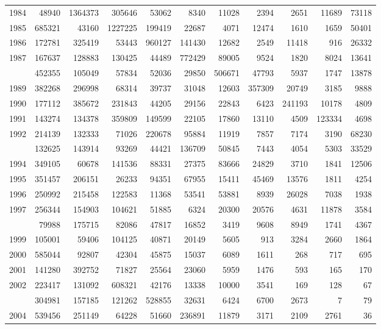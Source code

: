 \documentclass[
]{article}
\begin{document}
\begin{longtable}[t]{lrrrrrrrrrr}
1984 & 48940 & 1364373 & 305646 & 53062 & 8340 & 11028 & 2394 & 2651 & 11689 & 73118\\
1985 & 685321 & 43160 & 1227225 & 199419 & 22687 & 4071 & 12474 & 1610 & 1659 & 50401\\
1986 & 172781 & 325419 & 53443 & 960127 & 141430 & 12682 & 2549 & 11418 & 916 & 26332\\
1987 & 167637 & 128883 & 130425 & 44489 & 772429 & 89005 & 9524 & 1820 & 8024 & 13641\\
\addlinespace
1988 & 452355 & 105049 & 57834 & 52036 & 29850 & 506671 & 47793 & 5937 & 1747 & 13878\\
1989 & 382268 & 296998 & 68314 & 39737 & 31048 & 12603 & 357309 & 20749 & 3185 & 9888\\
1990 & 177112 & 385672 & 231843 & 44205 & 29156 & 22843 & 6423 & 241193 & 10178 & 4809\\
1991 & 143274 & 134378 & 359809 & 149599 & 22105 & 17860 & 13110 & 4509 & 123334 & 4698\\
1992 & 214139 & 132333 & 71026 & 220678 & 95884 & 11919 & 7857 & 7174 & 3190 & 68230\\
\addlinespace
1993 & 132625 & 143914 & 93269 & 44421 & 136709 & 50845 & 7443 & 4054 & 5303 & 33529\\
1994 & 349105 & 60678 & 141536 & 88331 & 27375 & 83666 & 24829 & 3710 & 1841 & 12506\\
1995 & 351457 & 206151 & 26233 & 94351 & 67955 & 15411 & 45469 & 13576 & 1811 & 4254\\
1996 & 250992 & 215458 & 122583 & 11368 & 53541 & 53881 & 8939 & 26028 & 7038 & 1938\\
1997 & 256344 & 154903 & 104621 & 51885 & 6324 & 20300 & 20576 & 4631 & 11878 & 3584\\
\addlinespace
1998 & 79988 & 175715 & 82086 & 47817 & 16852 & 3419 & 9608 & 8949 & 1741 & 4367\\
1999 & 105001 & 59406 & 104125 & 40871 & 20149 & 5605 & 913 & 3284 & 2660 & 1864\\
2000 & 585044 & 92807 & 42304 & 45875 & 15037 & 6089 & 1611 & 268 & 717 & 695\\
2001 & 141280 & 392752 & 71827 & 25564 & 23060 & 5959 & 1476 & 593 & 165 & 170\\
2002 & 223417 & 131092 & 608321 & 42176 & 13338 & 10000 & 3541 & 169 & 128 & 67\\
\addlinespace
2003 & 304981 & 157185 & 121262 & 528855 & 32631 & 6424 & 6700 & 2673 & 7 & 79\\
2004 & 539456 & 251149 & 64228 & 51660 & 236891 & 11879 & 3171 & 2109 & 2761 & 36\\

\end{longtable}
\end{document}
